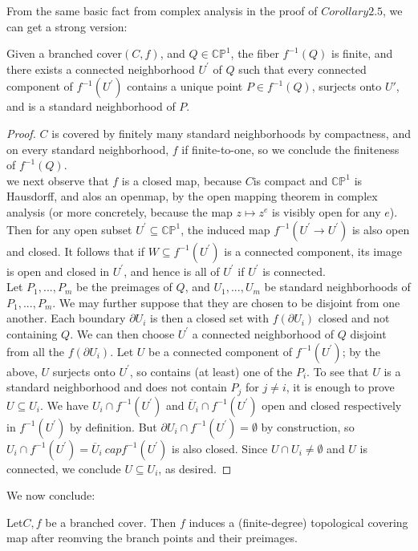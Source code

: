 \documentclass{article}
\begin{document}
From the same basic fact from complex analysis in the proof of $Corollary 2.5$, we can get a strong version:
\begin{lemma}\label{definition:2.6}
  Given a branched cover$(C,f)$, and $Q \in \mathbb{CP}^{1}$, the fiber $f^{-1}(Q)$ is finite, and there exists a connected neighborhood $U^{'}$ of $Q$ such that every connected component of $f^{-1}(U^{'})$ contains a unique point $P \in f^{-1}(Q)$, surjects onto $U{'}$, and is a standard neighborhood of $P$.
\end{lemma}
\begin{proof}
  $C$ is covered by finitely many standard neighborhoods by compactness, and on every standard neighborhood, $f$ if finite-to-one, so we conclude the finiteness of $f^{-1}(Q)$.
  \\
  we next observe that $f$ is a closed map, because $C$is compact and $\mathbb{CP}^{1}$ is Hausdorff, and alos an openmap, by the open mapping theorem in complex analysis (or more concretely, because the map $z \mapsto z^{e}$ is visibly open for any $e$). Then for any open subset $U^{'} \subseteq \mathbb{CP}^{1}$, the induced map $f^{-1}(U^{'} \to U^{'})$ is also open and closed. It follows that if $W \subseteq f^{-1}(U^{'})$ is a connected component, its image is open and closed in $U^{'}$, and hence is all of $U^{'}$ if $U^{'}$ is connected.
  \\
  Let $P_{1},...,P_{m}$ be the preimages of $Q$, and $U_{1},...,U_{m}$ be standard neighborhoods of $P_{1},...,P_{m}$. We may further suppose that they are chosen to be disjoint from one another. Each boundary $\partial U_{i}$ is then a closed set with $f(\partial U_{i})$ closed and not containing $Q$. We can then choose $U^{'}$ a connected neighborhood of $Q$ disjoint from all the $f(\partial U_{i})$. Let $U$ be a connected component of $f^{-1}(U^{'})$;
  by the above, $U$ surjects onto $U^{'}$, so contains (at least) one of the $P_{i}$. To see that $U$ is a standard neighborhood and does not contain $P_{j}$ for $j \neq i$, it is enough to prove $U \subseteq U_{i}$. We have $U_{i} \cap f^{-1}(U^{'})$ and $\overline{U}_{i} \cap f^{-1}(U^{'})$ open and closed respectively in $f^{-1}(U^{'})$ by definition. But $\partial U_{i} \cap f^{-1}(U^{'}) = \emptyset$ by construction, so $U_{i} \cap f^{-1}(U^{'})=\overline{U}_{i} \ cap f^{-1}(U^{'})$ is also closed. Since $U \cap U_{i} \neq \emptyset$ and $U$ is connected, we conclude $U \subseteq U_{i}$, as desired.
\end{proof}
We now conclude:
\begin{corollary}
  Let$C,f$ be a branched cover. Then $f$ induces a (finite-degree) topological covering map after reomving the branch points and their preimages.
\end{corollary}
\end{document}
